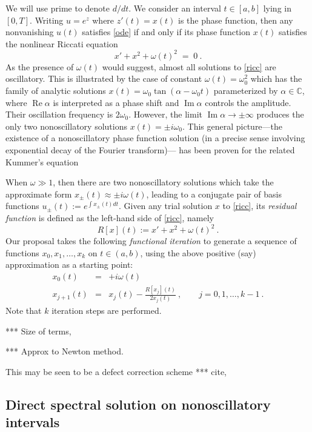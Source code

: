 \documentclass[10pt]{article}
\newcommand{\be}{\begin{equation}}
\newcommand{\ee}{\end{equation}}
\newcommand{\bea}{\begin{eqnarray}}
\newcommand{\eea}{\end{eqnarray}}
\newcommand{\C}{\mathbb{C}}
\DeclareMathOperator{\im}{Im}
\DeclareMathOperator{\re}{Re}
\newcommand{\om}{\omega}
\begin{document}
We will use prime to denote $d/dt$.
We consider an interval $t\in[a,b]$ lying in $[0,T]$.
Writing $u = e^z$ where $z'(t) = x(t)$ is the phase function,
then any nonvanishing $u(t)$ satisfies \eqref{ode} if and only if
its phase function $x(t)$ satisfies the nonlinear Riccati equation
\be
x' + x^2 + \om(t)^2 \;=\; 0~.
\label{ricc}
\ee
As the presence of $\om(t)$ would suggest,
almost all solutions to \eqref{ricc} are oscillatory.
This is illustrated by the case of constant $\om(t) = \om_0^2$
which has the family of analytic solutions
$x(t) = \om_0 \tan(\alpha - \om_0t)$ parameterized by $\alpha\in\C$,
where $\re \alpha$ is interpreted as a phase shift and $\im \alpha$
controls the amplitude. Their oscillation frequency is $2\om_0$.
However, the limit $\im \alpha \to \pm \infty$ produces
the only two nonoscillatory solutions $x(t) = \pm i\om_0$.
This general picture---the existence of a nonoscillatory
phase function solution
(in a precise sense involving exponential decay of the Fourier
transform)--- has been proven \cite{Heit15,Brem16}
for the related Kummer's equation












When $\om\gg 1$, then there are two nonoscillatory solutions
which take the approximate form
$x_{\pm}(t) \approx \pm i\om(t)$, leading to a conjugate pair of basis
functions $u_{\pm}(t) := e^{\int x_\pm(t) dt}$.
Given any trial solution $x$ to \eqref{ricc}, its \textit{residual
  function} is defined as the left-hand side of \eqref{ricc}, namely
\be
R[x](t) := x' + x^2 + \om(t)^2~.
\label{R}
\ee
Our proposal takes the following \textit{functional iteration}
to generate a sequence of functions $x_0, x_1, \dots, x_k$
on $t\in(a,b)$,
using the above positive (say) approximation as a starting point:
\bea
x_0(t) &=& +i\om(t)
\label{init}
\\
x_{j+1}(t) &=& x_j(t) - \frac{R[x_j](t)}{2 x_j(t)}
~,\qquad j=0,1,\dots,k-1~.
\label{iter}
\eea
Note that $k$ iteration steps are performed.

*** Size of terms,

*** Approx to Newton method.

This may be seen to be a defect correction scheme
*** cite,

\subsection{Direct spectral solution on nonoscillatory intervals}
\end{document}
